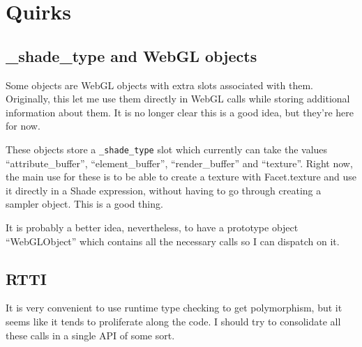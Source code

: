 \chapter{Quirks}

\section{\_shade\_type and WebGL objects}

Some \facet objects are WebGL objects with extra slots associated with
them. Originally, this let me use them directly in WebGL calls while
storing additional information about them. It is no longer clear this
is a good idea, but they're here for now.

These objects store a \texttt{\_shade\_type} slot which currently can
take the values ``attribute\_buffer'', ``element\_buffer'', ``render\_buffer'' and
``texture''. Right now, the main use for these is to be able to create
a texture with Facet.texture and use it directly in a Shade
expression, without having to go through creating a sampler
object. This is a good thing.

It is probably a better idea, nevertheless, to have a prototype object
``WebGLObject'' which contains all the necessary calls so I can
dispatch on it.

\section{RTTI}

It is very convenient to use runtime type checking to get
polymorphism, but it seems like it tends to proliferate along the
code. I should try to consolidate all these calls in a single API of
some sort.
